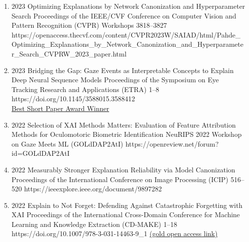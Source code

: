 {\begin{enumerate}
        \item {}
                            {2023}
                            {Optimizing Explanations by Network Canonization and Hyperparameter Search}
                            {Proceedings of the IEEE/CVF Conference on Computer Vision and Pattern Recognition (CVPR) Workshops}
                            {3818--3827}
                            {https://openaccess.thecvf.com/content/CVPR2023W/SAIAD/html/Pahde_Optimizing_Explanations_by_Network_Canonization_and_Hyperparameter_Search_CVPRW_2023_paper.html} 
                            

        \item {}
                            {2023}
                            {Bridging the Gap: Gaze Events as Interpretable Concepts to Explain Deep Neural Sequence Models}
                            {Proceedings of the Symposium on Eye Tracking Research and Applications (ETRA)}
                            {1--8}
                            {https://doi.org/10.1145/3588015.3588412} 
                            {\\\href{https://datacloud.hhi.fraunhofer.de/s/YExo6qyWDxksRof}{Best Short Paper Award Winner}}

        \item {}
                            {2022}
                            {Selection of XAI Methods Matters: Evaluation of Feature Attribution Methods for Oculomotoric Biometric Identification}
                            {NeuRIPS 2022 Workshop on Gaze Meets ML}
                            {(GOLdDAP2AtI)}
                            {https://openreview.net/forum?id=GOLdDAP2AtI} 


        \item {}
                            {2022}
                            {Measurably Stronger Explanation Reliability via Model Canonization}
                            {Proceedings of the International Conference on Image Processing (ICIP)}
                            {516--520}
                            {https://ieeexplore.ieee.org/document/9897282}

        \item {}
                            {2022}
                            {Explain to Not Forget: Defending Against Catastrophic Forgetting with XAI}
                            {Proceedings of the International Cross-Domain Conference for Machine Learning and Knowledge Extraction (CD-MAKE)}
                            {1--18}
                            {https://doi.org/10.1007/978-3-031-14463-9_1}
                            {\href{https://link.springer.com/content/pdf/10.1007/978-3-031-04083-2.pdf}{(gold open access link)}} %


\end{enumerate}}
